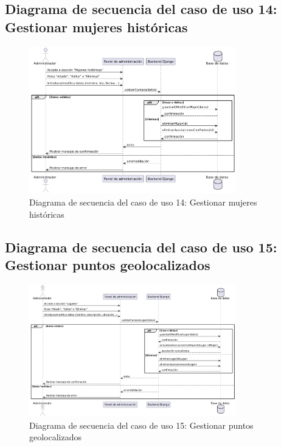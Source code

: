 \subsection{Diagrama de secuencia del caso de uso 14: Gestionar mujeres históricas}
\begin{figure}[H]
    \centering
    \includegraphics[width=0.8\textwidth]{figs/caso14.png}
    \caption{Diagrama de secuencia del caso de uso 14: Gestionar mujeres históricas}
\end{figure}

\subsection{Diagrama de secuencia del caso de uso 15: Gestionar puntos geolocalizados}
\begin{figure}[H]
    \centering
    \includegraphics[width=0.8\textwidth]{figs/caso15.png}
    \caption{Diagrama de secuencia del caso de uso 15: Gestionar puntos geolocalizados}
\end{figure}

